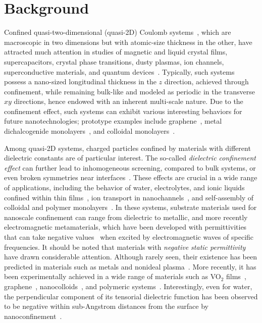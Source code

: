 \section{Background}

Confined quasi-two-dimensional (quasi-2D) Coulomb systems~\cite{mazars2011long}, which are macroscopic in two dimensions but with atomic-size thickness in the other, have attracted much attention in studies of magnetic and liquid crystal films, supercapacitors, crystal phase transitions, dusty plasmas, ion channels, superconductive materials, and quantum devices~\cite{kawamoto2002history, hille2001ionic, teng2003microscopic, Messina2017PRL, mazars2011long, saito2016highly, liu20192d}. 
Typically, such systems possess a nano-sized longitudinal thickness in the $z$ direction, achieved through confinement, while remaining bulk-like and modeled as periodic in the transverse $xy$ directions, hence endowed with an inherent multi-scale nature.
Due to the confinement effect, such systems can exhibit various interesting behaviors for future nanotechnologies; prototype examples include graphene~\cite{novoselov2004electric}, metal dichalcogenide monolayers~\cite{kumar2012tunable}, and colloidal monolayers~\cite{mangold2003phase}.

Among quasi-2D systems, charged particles confined by materials with different dielectric constants are of particular interest. 
The so-called \emph{dielectric confinement effect} can further lead to inhomogeneous screening, compared to bulk systems, or even broken symmetries near interfaces~\cite{C0NR00698J,wang2016inhomogeneous,gao2024broken}.
These effects are crucial in a wide range of applications, including the behavior of water, electrolytes, and ionic liquids confined within thin films~\cite{raviv2001fluidity}, ion transport in nanochannels~\cite{zhu2019ion}, and self-assembly of colloidal and polymer monolayers~\cite{kim2017imaging}.
In these systems, substrate materials used for nanoscale confinement can range from dielectric to metallic, and more recently electromagnetic metamaterials, which have been developed with permittivities that can take negative values~\cite{veselago1967electrodynamics, smith2004metamaterials, cheng2017tunable, xie2022recent, xu2020polyaniline} when excited by electromagnetic waves of specific frequencies.  
It should be noted that materials with \emph{negative static permittivity} have drawn considerable attention. Although rarely seen, their existence has been predicted in materials such as metals and nonideal plasma~\cite{Dolgov1918admissible,homes2001optical}. More recently, it has been experimentally achieved in a wide range of materials such as VO$_2$ films~\cite{kana2016thermally}, graphene~\cite{nazarov2015negative}, nanocolloids~\cite{shulman2007plasmalike}, and polymeric systems~\cite{yan2013negative}.
Interestingly, even for water, the perpendicular component of its tensorial dielectric function has been observed to be negative within sub-Angstrom distances from the surface by nanoconfinement~\cite{Kornyshev1996Static, Schlaich2016Water, Kornyshev2021Nonlocal}.



